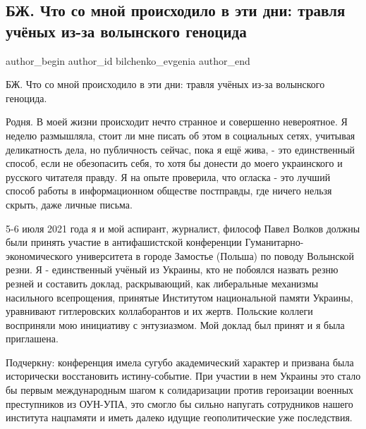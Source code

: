  
 
 
 
 
 
\subsection{БЖ. Что со мной происходило в эти дни: травля учёных из-за волынского геноцида}
\label{sec:11_07_2021.fb.bilchenko_evgenia.1.travlja}
\ifcmt
 author_begin
   author_id bilchenko_evgenia
 author_end
\fi

БЖ. Что со мной происходило в эти дни: травля учёных из-за волынского геноцида.

Родня. В моей жизни происходит нечто странное и совершенно невероятное. Я
неделю размышляла, стоит ли мне писать об этом в социальных сетях, учитывая
деликатность дела, но публичность сейчас, пока я ещё жива, - это единственный
способ, если не обезопасить себя, то хотя бы донести до моего украинского и
русского читателя правду. Я на опыте проверила, что огласка - это лучший способ
работы в информационном обществе постправды, где ничего нельзя скрыть, даже
личные письма.

5-6 июля 2021 года я и мой аспирант, журналист, философ Павел Волков должны
были принять  участие в антифашистской конференции Гуманитарно-экономического
университета в городе Замостье (Польша) по поводу Волынской резни. Я -
единственный учёный из Украины, кто не побоялся назвать резню резней и
составить доклад, раскрывающий, как либеральные механизмы насильного
всепрощения, принятые Институтом национальной памяти Украины, уравнивают
гитлеровских коллаборантов и их жертв. Польские коллеги восприняли мою
инициативу с энтузиазмом. Мой доклад был принят и я была приглашена.

Подчеркну: конференция имела сугубо академический характер и призвана была
исторически восстановить истину-событие. При участии в нем Украины это стало бы
первым международным шагом к солидаризации против героизации военных
преступников из ОУН-УПА, это смогло бы сильно напугать сотрудников нашего
института нацпамяти и иметь далеко идущие геополитические уже последствия.

